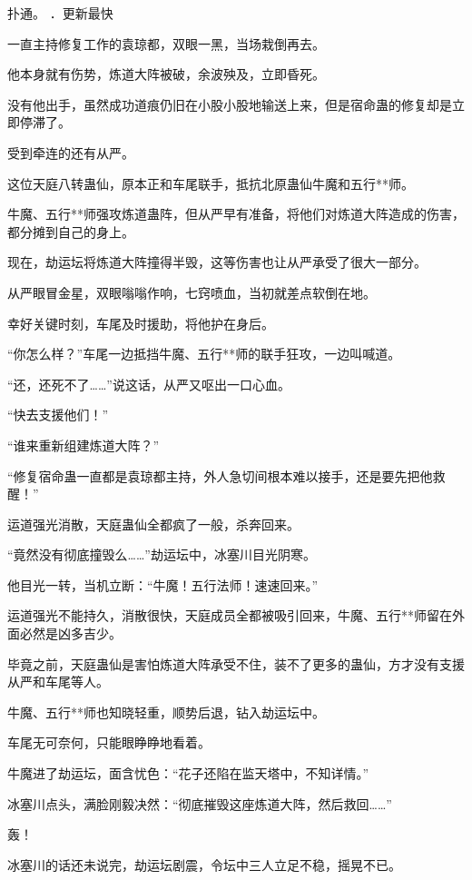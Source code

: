 
\begin{this_body}

扑通。 ．更新最快

一直主持修复工作的袁琼都，双眼一黑，当场栽倒再去。

他本身就有伤势，炼道大阵被破，余波殃及，立即昏死。

没有他出手，虽然成功道痕仍旧在小股小股地输送上来，但是宿命蛊的修复却是立即停滞了。

受到牵连的还有从严。

这位天庭八转蛊仙，原本正和车尾联手，抵抗北原蛊仙牛魔和五行**师。

牛魔、五行**师强攻炼道蛊阵，但从严早有准备，将他们对炼道大阵造成的伤害，都分摊到自己的身上。

现在，劫运坛将炼道大阵撞得半毁，这等伤害也让从严承受了很大一部分。

从严眼冒金星，双眼嗡嗡作响，七窍喷血，当初就差点软倒在地。

幸好关键时刻，车尾及时援助，将他护在身后。

“你怎么样？”车尾一边抵挡牛魔、五行**师的联手狂攻，一边叫喊道。

“还，还死不了……”说这话，从严又呕出一口心血。

“快去支援他们！”

“谁来重新组建炼道大阵？”

“修复宿命蛊一直都是袁琼都主持，外人急切间根本难以接手，还是要先把他救醒！”

运道强光消散，天庭蛊仙全都疯了一般，杀奔回来。

“竟然没有彻底撞毁么……”劫运坛中，冰塞川目光阴寒。

他目光一转，当机立断：“牛魔！五行法师！速速回来。”

运道强光不能持久，消散很快，天庭成员全都被吸引回来，牛魔、五行**师留在外面必然是凶多吉少。

毕竟之前，天庭蛊仙是害怕炼道大阵承受不住，装不了更多的蛊仙，方才没有支援从严和车尾等人。

牛魔、五行**师也知晓轻重，顺势后退，钻入劫运坛中。

车尾无可奈何，只能眼睁睁地看着。

牛魔进了劫运坛，面含忧色：“花子还陷在监天塔中，不知详情。”

冰塞川点头，满脸刚毅决然：“彻底摧毁这座炼道大阵，然后救回……”

轰！

冰塞川的话还未说完，劫运坛剧震，令坛中三人立足不稳，摇晃不已。


\end{this_body}
